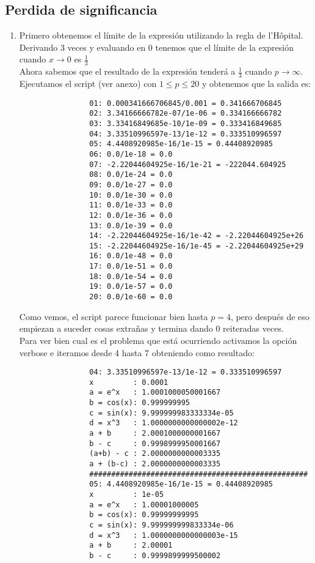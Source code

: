 \documentclass[spanish, fleqn]{article}
\begin{document}
	\subsection{Perdida de significancia}
	\begin{enumerate}
		\item
			Primero obtenemos el límite de la expresión utilizando la regla de
			l'Hôpital. Derivando 3 veces y evaluando en 0 tenemos que el
			límite de la expresión cuando $x \rightarrow 0$ es $\frac{1}{3}$\\
			Ahora sabemos que el resultado de la expresión tenderá a 
			$\frac{1}{3}$ cuando $p \rightarrow \infty$. 
			Ejecutamos el script (ver anexo) con $1 \leq p \leq 20$ y obtenemos
			que la salida es:
			\begin{verbatim}
				01: 0.000341666706845/0.001 = 0.341666706845
				02: 3.34166666782e-07/1e-06 = 0.334166666782
				03: 3.33416849685e-10/1e-09 = 0.333416849685
				04: 3.33510996597e-13/1e-12 = 0.333510996597
				05: 4.4408920985e-16/1e-15 = 0.44408920985
				06: 0.0/1e-18 = 0.0
				07: -2.22044604925e-16/1e-21 = -222044.604925
				08: 0.0/1e-24 = 0.0
				09: 0.0/1e-27 = 0.0
				10: 0.0/1e-30 = 0.0
				11: 0.0/1e-33 = 0.0
				12: 0.0/1e-36 = 0.0
				13: 0.0/1e-39 = 0.0
				14: -2.22044604925e-16/1e-42 = -2.22044604925e+26
				15: -2.22044604925e-16/1e-45 = -2.22044604925e+29
				16: 0.0/1e-48 = 0.0
				17: 0.0/1e-51 = 0.0
				18: 0.0/1e-54 = 0.0
				19: 0.0/1e-57 = 0.0
				20: 0.0/1e-60 = 0.0
			\end{verbatim}
			Como vemos, el script parece funcionar bien hasta $p=4$, pero
			después de eso empiezan a suceder cosas extrañas y termina dando 0
			reiteradas veces.\\
			Para ver bien cual es el problema que está ocurriendo activamos la
			opción verbose e iteramos desde 4 hasta 7 obteniendo como resultado:
			\begin{verbatim}
				04: 3.33510996597e-13/1e-12 = 0.333510996597
				x         : 0.0001
				a = e^x   : 1.0001000050001667
				b = cos(x): 0.999999995
				c = sin(x): 9.999999983333334e-05
				d = x^3   : 1.0000000000000002e-12
				a + b     : 2.0001000000001667
				b - c     : 0.9998999950001667
				(a+b) - c : 2.0000000000003335
				a + (b-c) : 2.0000000000003335
				##################################################
				05: 4.4408920985e-16/1e-15 = 0.44408920985
				x         : 1e-05
				a = e^x   : 1.00001000005
				b = cos(x): 0.99999999995
				c = sin(x): 9.999999999833334e-06
				d = x^3   : 1.0000000000000003e-15
				a + b     : 2.00001
				b - c     : 0.9999899999500002

\end{verbatim}
\end{enumerate}
\end{document}
